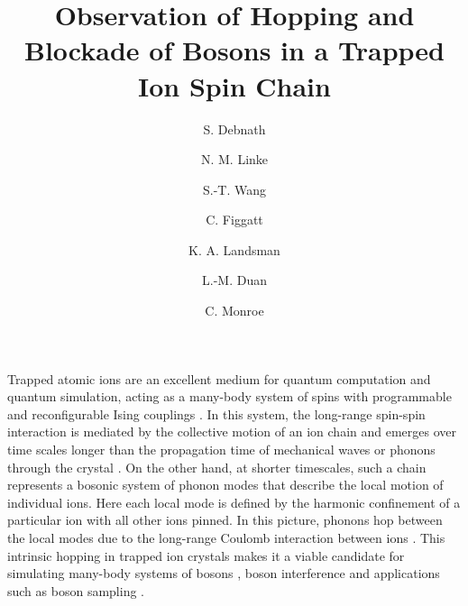 \documentclass[groupaddress,9pt,twocolumn,superscriptaddress, aps, prl]{revtex4-1}
\begin{document}
\title{Observation of Hopping and Blockade of Bosons in a Trapped Ion Spin Chain}
\author{S. Debnath}
\author{N. M. Linke} 
\author{S.-T. Wang}
\author{C. Figgatt}
\author{K. A. Landsman}
\author{L.-M. Duan}
\author{C. Monroe}

\maketitle









Trapped atomic ions are an excellent medium for quantum computation and quantum simulation, acting as a many-body system of spins with programmable and reconfigurable Ising couplings \cite{Islam2013, Monz2016, Debnath2016}. In this system, the long-range spin-spin interaction is mediated by the collective motion of an ion chain and emerges over time scales longer than the propagation time of mechanical waves or phonons through the crystal \cite{Zhu2006a, Zhu2006}. On the other hand, at shorter timescales, such a chain represents a bosonic system of phonon modes that describe the local motion of individual ions. Here each local mode is defined by the harmonic confinement of a particular ion with all other ions pinned. In this picture, phonons hop between the local modes due to the long-range Coulomb interaction between ions \cite{Porras2004, Ivanov2009, Mering2009}. This intrinsic hopping in trapped ion crystals makes it a viable candidate for simulating many-body systems of bosons \cite{Porras2004, Ivanov2009}, boson interference \cite{Toyoda2015} and applications such as boson sampling \cite{Shen2014}.
\end{document}
